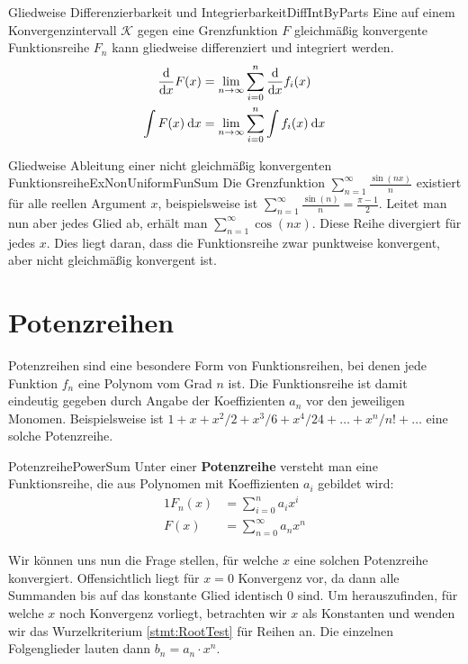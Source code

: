 \begin{statement}{Gliedweise Differenzierbarkeit und Integrierbarkeit}{DiffIntByParts}
    Eine auf einem Konvergenzintervall $\mathcal{K}$ gegen eine Grenzfunktion $F$ gleichmäßig konvergente Funktionsreihe $F_n$ kann gliedweise differenziert und integriert werden.
    \begin{alignat*}{1}
        \frac{\mathrm{d}{}}{\mathrm{d}{x}} F(x)      &= \lim\limits_{n\to\infty} \sum\limits_{i=0}^n \frac{\mathrm{d}{}}{\mathrm{d}{x}} f_i(x) \\
        \int F(x) \:\mathrm{d}{x} &= \lim\limits_{n\to\infty} \sum\limits_{i=0}^n \int f_i(x) \:\mathrm{d}{x}
    \end{alignat*}
\end{statement}

\begin{example}{Gliedweise Ableitung einer nicht gleichmäßig konvergenten Funktionsreihe}{ExNonUniformFunSum}
    Die Grenzfunktion $\sum\limits_{n=1}^\infty \frac{\sin(nx)}{n}$ existiert für alle reellen Argument $x$, beispielsweise ist $\sum\limits_{n=1}^\infty \frac{\sin(n)}{n} = \frac{\pi-1}{2}$. Leitet man nun aber jedes Glied ab, erhält man $\sum\limits_{n=1}^\infty \cos(nx)$. Diese Reihe divergiert für jedes $x$. Dies liegt daran, dass die Funktionsreihe zwar punktweise konvergent, aber nicht gleichmäßig konvergent ist.
\end{example}

\section{Potenzreihen}

Potenzreihen sind eine besondere Form von Funktionsreihen, bei denen jede Funktion $f_n$ eine Polynom vom Grad $n$ ist. Die Funktionsreihe ist damit eindeutig gegeben durch Angabe der Koeffizienten $a_n$ vor den jeweiligen Monomen. Beispielsweise ist $1+x+x^2/2+x^3/6+x^4/24 + \dots + x^n/n! + \dots$ eine solche Potenzreihe.

\begin{definition}{Potenzreihe}{PowerSum}
    Unter einer \textbf{Potenzreihe} versteht man eine Funktionsreihe, die aus Polynomen mit Koeffizienten $a_i$ gebildet wird:
    \begin{alignat*}{1}
        F_n(x) &= \sum\limits_{i=0}^n a_i x^i \\
        F(x)   &= \sum\limits_{n=0}^\infty a_n x^n
    \end{alignat*}
\end{definition}

Wir können uns nun die Frage stellen, für welche $x$ eine solchen Potenzreihe konvergiert. Offensichtlich liegt für $x=0$ Konvergenz vor, da dann alle Summanden bis auf das konstante Glied identisch $0$ sind. Um herauszufinden, für welche $x$ noch Konvergenz vorliegt, betrachten wir $x$ als Konstanten und wenden wir das Wurzelkriterium \ref{stmt:RootTest} für Reihen an. Die einzelnen Folgenglieder lauten dann $b_n = a_n \cdot x^n$.

